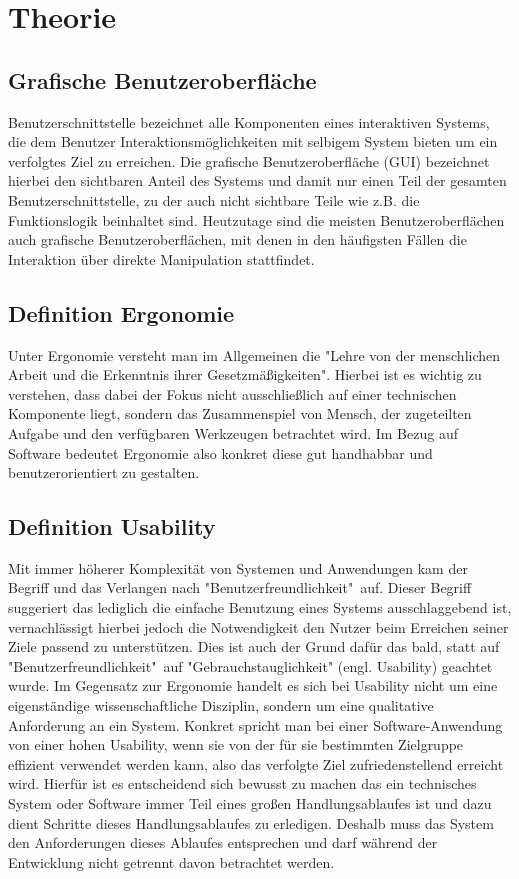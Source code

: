 \chapter{Theorie}\label{ch:data}

\section{Grafische Benutzeroberfläche}
Benutzerschnittstelle bezeichnet alle Komponenten eines interaktiven Systems, die dem Benutzer Interaktionsmöglichkeiten mit selbigem System bieten um ein verfolgtes Ziel zu erreichen.
Die grafische Benutzeroberfläche (GUI) bezeichnet hierbei den sichtbaren Anteil des Systems und damit nur einen Teil der gesamten Benutzerschnittstelle, zu der auch nicht sichtbare Teile wie z.B. die Funktionslogik beinhaltet sind.\cite{Sarodnick.2016}
Heutzutage sind die meisten Benutzeroberflächen auch grafische Benutzeroberflächen, mit denen in den häufigsten Fällen die Interaktion  über direkte Manipulation stattfindet.\cite{Nielsen.1995?}

\section{Definition Ergonomie}
Unter Ergonomie versteht man im Allgemeinen die "Lehre von der menschlichen Arbeit und die Erkenntnis ihrer Gesetzmäßigkeiten"\cite{https:www.facebook.comArbeitsplatzergonomie.2014}.
Hierbei ist es wichtig zu verstehen, dass dabei der Fokus nicht ausschließlich auf einer technischen Komponente liegt, sondern das Zusammenspiel von Mensch, der zugeteilten Aufgabe und den verfügbaren Werkzeugen betrachtet wird\cite{Sarodnick.2016}.
Im Bezug auf Software bedeutet Ergonomie also konkret diese gut handhabbar und benutzerorientiert zu gestalten.

\section{Definition Usability}
Mit immer höherer Komplexität von Systemen und Anwendungen kam der Begriff und das Verlangen nach  "Benutzerfreundlichkeit"\ auf.
Dieser Begriff suggeriert das lediglich die einfache Benutzung eines Systems ausschlaggebend ist, vernachlässigt hierbei jedoch die Notwendigkeit den Nutzer beim Erreichen seiner Ziele passend zu unterstützen.
Dies ist auch der Grund dafür das bald, statt auf "Benutzerfreundlichkeit"\ auf "Gebrauchstauglichkeit" (engl. Usability) geachtet wurde.
Im Gegensatz zur Ergonomie handelt es sich bei Usability nicht um eine eigenständige wissenschaftliche Disziplin, sondern um eine qualitative Anforderung an ein System\cite{Sarodnick.2016}.
Konkret spricht man bei einer Software-Anwendung von einer hohen Usability, wenn sie von der für sie bestimmten Zielgruppe effizient verwendet werden kann, also das verfolgte Ziel zufriedenstellend erreicht wird\cite{Richter.2016}.
Hierfür ist es entscheidend sich bewusst zu machen das ein technisches System oder Software immer Teil eines großen Handlungsablaufes ist und dazu dient Schritte dieses Handlungsablaufes zu erledigen.
Deshalb muss das System den Anforderungen dieses Ablaufes entsprechen und darf während der Entwicklung nicht getrennt davon betrachtet werden\cite{Sarodnick.2016}.

